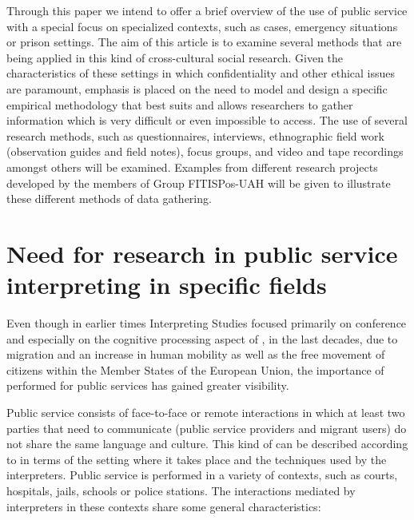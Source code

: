\documentclass[output=paper]{LSP/langsci}
\begin{document}
Through this paper we intend to offer a brief overview of the use of public service  with a special focus on specialized contexts, such as  cases, emergency situations or prison settings. The aim of this article is to examine several methods that are being applied in this kind of cross-cultural social research. Given the characteristics of these settings in which confidentiality and other ethical issues are paramount, emphasis is placed on the need to model and design a specific empirical methodology that best suits and allows researchers to gather information which is very difficult or even impossible to access. The use of several research methods, such as questionnaires, interviews, ethnographic field work (observation guides and field notes), focus groups, and video and tape recordings amongst others will be examined. Examples from different research projects developed by the members of Group FITISPos-UAH will be given to illustrate these different methods of data gathering. 

\section{Need for research in public service interpreting in specific fields}

Even though in earlier times Interpreting Studies focused primarily on conference  and especially on the cognitive processing aspect of , in the last decades, due to migration and an increase in human mobility as well as the free movement of citizens within the Member States of the European Union, the importance of  performed for public services has gained greater visibility. 

Public service  consists of face-to-face or remote interactions in which at least two parties that need to communicate (public service providers and migrant users) do not share the same language and culture. This kind of  can be described according to \citet{Gentile1996} in terms of the setting where it takes place and the techniques used by the interpreters. Public service  is performed in a variety of contexts, such as courts, hospitals, jails, schools or police stations. The interactions mediated by interpreters in these contexts share some general characteristics: 
\end{document}
